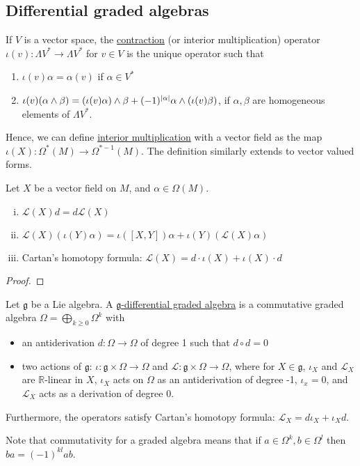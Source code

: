 \subsection{Differential graded algebras}
\begin{defn} \label{def:contraction} %
	If $V$ is a vector space, the \underline{contraction} (or interior
	multiplication) operator $\iota(v) :
	\Lambda V^* \to \Lambda V^*$ for $v\in V$ is the unique operator such that
	\begin{enumerate}[(1)]
	    \item $\iota(v)\alpha = \alpha(v)$ if  $\alpha\in V^*$
		\item $\iota(v)(\alpha\wedge\beta) = (\iota(v)\alpha)\wedge\beta + 
			(-1)^{\abs{\alpha}}\alpha\wedge(\iota(v)\beta)$, if  $\alpha,\beta$
			are homogeneous elements of  $\Lambda V^*$.
	\end{enumerate} %
\end{defn}
Hence, we can define \underline{interior multiplication} with a vector
field as the map $\iota(X) : \Omega^*(M) \to \Omega^{*-1}(M)$.
The definition similarly extends to vector valued forms.
\begin{thm} %
	Let $X$ be a vector field on  $M$, and $\alpha\in \Omega(M)$. 
	\begin{enumerate}[(i)]
	    \item $\mathcal{L}(X)d = d\mathcal{L}(X)$
		\item $\mathcal{L}(X)(\iota(Y)\alpha) = \iota([X,Y])\alpha +
			\iota(Y)(\mathcal{L}(X)\alpha)$ 
		\item Cartan's homotopy formula: $\mathcal{L}(X) = d
			\cdot\iota(X)+\iota(X)\cdot d$
	\end{enumerate}
\end{thm}
\begin{proof}
\end{proof}

\begin{defn}
	Let $\mathfrak{g}$ be a Lie algebra. A \underline{$\mathfrak{g}$-differential graded
	algebra} is a commutative graded algebra $\Omega= \bigoplus_{k\geq
	0}\Omega^k$ with 
	\begin{itemize}
		\item an antiderivation $d:\Omega\to\Omega$ of degree 1 such that
	$d\circ d = 0$
		\item two actions of $\mathfrak{g}$: $\iota:\mathfrak{g}\times\Omega\to\Omega$
			and  $\mathcal{L}:\mathfrak{g}\times\Omega\to\Omega$, where for
			$X\in\mathfrak{g}$,  $\iota_X$ and  $\mathcal{L}_X$ are
			$\mathbb{R}$-linear in $X$,  $\iota_X$ acts on  $\Omega$ as an
			antiderivation of degree -1,  $\iota_x = 0$, and  $\mathcal{L}_X$
			acts as a derivation of degree 0.
	\end{itemize}
	Furthermore, the operators satisfy Cartan's homotopy formula:
	$\mathcal{L}_X= d\iota_X+\iota_Xd$.
\end{defn}
Note that commutativity for a graded algebra means that if $a\in
\Omega^k,b\in\Omega^l$ then $ba = (-1)^{kl}ab$.  

